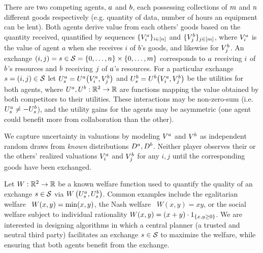 There are two competing agents, $a$ and $b$, each possessing 
collections of $m$ and $n$ 
different goods
respectively (e.g. quantity of data, number of hours an equipment can be lent).
Both agents derive value from each others' goods based on the quantity
received, quantified by sequences $\{V^a_{i}\}_{i\in[n]}$ and $\{V^b_{j}\}_{j\in[m]}$,
where $V^a_{i}$ is the value  of agent $a$ when she receives $i$ of $b$'s goods, and likewise for $V^b_{j}$.
An exchange 
\(
    \left(i,j\right)
    =
    s\in\mathcal{S}
    =
    \left\{0,\ldots,n\right\}\times\left\{0,\ldots,m\right\}
\)
corresponds to $a$ receiving $i$ of $b$'s resources and 
$b$ receiving $j$ of $a$'s resources.
For a particular exchange 
\(
    s = \left(i,j\right)
    \in\mathcal{S}
\)
let
\(
    U^a_{s} = U^a\big(V^a_{i},V^b_{j}\big)
\)
and
\(
    U^b_{s} = U^b\big(V^a_{i},V^b_{j}\big)
\)
be the utilities for both agents,
where
\(
    U^a,U^b:\mathbb{R}^2\rightarrow\mathbb{R}
\)
are functions mapping the value obtained by both competitors to their utilities.
These interactions may be non-zero-sum (i.e. $U^a_{s} \neq -U^b_{s}$), 
and the utility gains for the agents may be asymmetric (one agent could benefit more from collaboration than the other).

We capture uncertainty in valuations by modeling $V^a$ and $V^b$ as independent random draws from \emph{known} distributions $D^a, D^b$. Neither player observes their or the others' realized valuations $V^a_{i}$ and $V^b_{j}$ for any $i,j$ until the corresponding goods have been exchanged.




Let $W:\mathbb{R}^2\rightarrow\mathbb{R}$ be a known welfare function used to quantify the quality of an exchange
$s\in\mathcal{S}$ via $W\left(U^a_{s},U^b_{s}\right)$.
Common examples include the egalitarian welfare~\citep{mas1995microeconomic} 
$W(x,y)=\min(x,y)$, the 
Nash welfare~\citep{nash1950bargaining} $W(x,y)=xy$, or the social welfare subject to individual rationality 
$W(x,y)=(x+y)\cdot 1_{\left\{x,y\geq 0\right\}}$.
We are interested in designing  
algorithms in which a central planner (a trusted and neutral third party) facilitates an exchange $s\in\mathcal{S}$ to maximize the welfare, while ensuring that both agents benefit from the exchange.

